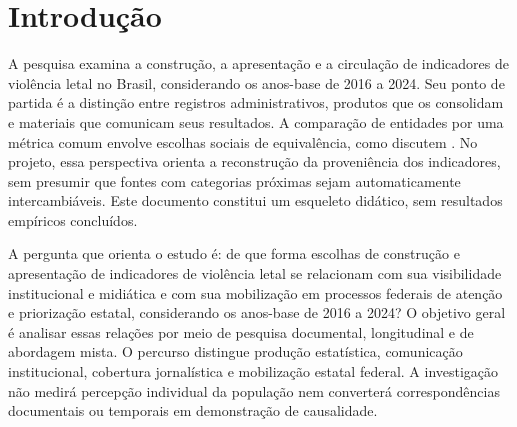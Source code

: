 \section{Introdução}

A pesquisa examina a construção, a apresentação e a circulação de indicadores de violência letal no Brasil, considerando os anos-base de 2016 a 2024. Seu ponto de partida é a distinção entre registros administrativos, produtos que os consolidam e materiais que comunicam seus resultados. A comparação de entidades por uma métrica comum envolve escolhas sociais de equivalência, como discutem . No projeto, essa perspectiva orienta a reconstrução da proveniência dos indicadores, sem presumir que fontes com categorias próximas sejam automaticamente intercambiáveis. Este documento constitui um esqueleto didático, sem resultados empíricos concluídos.

A pergunta que orienta o estudo é: de que forma escolhas de construção e apresentação de indicadores de violência letal se relacionam com sua visibilidade institucional e midiática e com sua mobilização em processos federais de atenção e priorização estatal, considerando os anos-base de 2016 a 2024? O objetivo geral é analisar essas relações por meio de pesquisa documental, longitudinal e de abordagem mista. O percurso distingue produção estatística, comunicação institucional, cobertura jornalística e mobilização estatal federal. A investigação não medirá percepção individual da população nem converterá correspondências documentais ou temporais em demonstração de causalidade.
